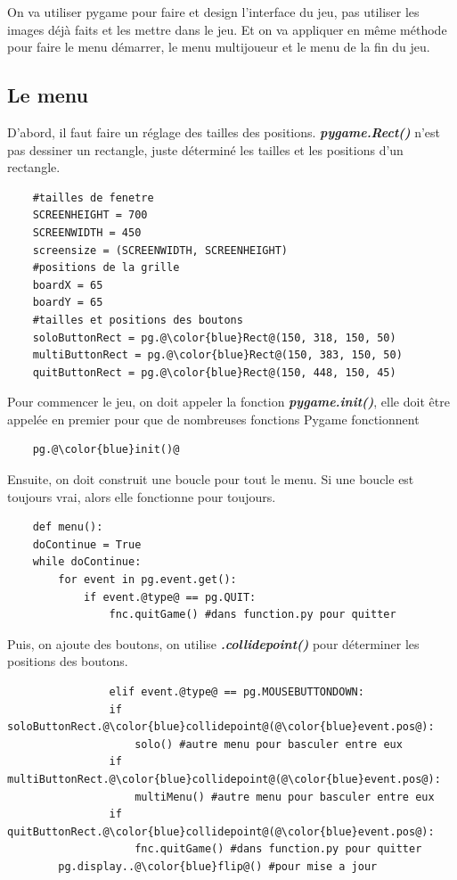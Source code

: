 \documentclass[a4paper]{report}
\begin{document}
On va utiliser pygame pour faire et design l'interface du jeu, pas utiliser les images déjà faits et les mettre dans le jeu.
Et on va appliquer en même méthode pour faire le menu démarrer, le menu multijoueur et le menu de la fin du jeu.

\subsection{Le menu}
D'abord, il faut faire un réglage des tailles des positions. \textbf{\textit{pygame.Rect()}} n'est pas dessiner un rectangle, juste déterminé les tailles et les positions d'un rectangle.
\begin{lstlisting}
    #tailles de fenetre
    SCREENHEIGHT = 700
    SCREENWIDTH = 450
    screensize = (SCREENWIDTH, SCREENHEIGHT)
    #positions de la grille
    boardX = 65
    boardY = 65
    #tailles et positions des boutons
    soloButtonRect = pg.@\color{blue}Rect@(150, 318, 150, 50)
    multiButtonRect = pg.@\color{blue}Rect@(150, 383, 150, 50)
    quitButtonRect = pg.@\color{blue}Rect@(150, 448, 150, 45)
\end{lstlisting}

Pour commencer le jeu, on doit appeler la fonction \textbf{\textit{pygame.init()}}, elle doit être appelée en premier pour que de nombreuses fonctions Pygame fonctionnent
\begin{lstlisting}
    pg.@\color{blue}init()@
\end{lstlisting}

Ensuite, on doit construit une boucle pour tout le menu. Si une boucle est toujours vrai, alors elle fonctionne pour toujours.
\begin{lstlisting}
    def menu():
    doContinue = True
    while doContinue:
        for event in pg.event.get():
            if event.@type@ == pg.QUIT:
                fnc.quitGame() #dans function.py pour quitter
\end{lstlisting}

Puis, on ajoute des boutons, on utilise \textbf{\textit{.collidepoint()}} pour déterminer les positions des boutons.
\begin{lstlisting}
                elif event.@type@ == pg.MOUSEBUTTONDOWN:
                if soloButtonRect.@\color{blue}collidepoint@(@\color{blue}event.pos@):
                    solo() #autre menu pour basculer entre eux
                if multiButtonRect.@\color{blue}collidepoint@(@\color{blue}event.pos@):
                    multiMenu() #autre menu pour basculer entre eux
                if quitButtonRect.@\color{blue}collidepoint@(@\color{blue}event.pos@):
                    fnc.quitGame() #dans function.py pour quitter
        pg.display..@\color{blue}flip@() #pour mise a jour
\end{lstlisting}
\end{document}

